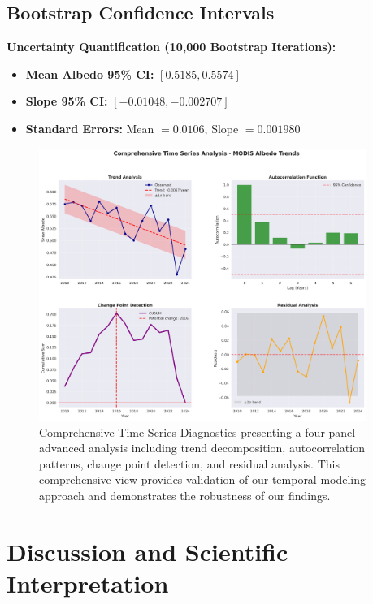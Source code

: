 \documentclass[12pt,a4paper]{article}
\begin{document}
\subsection{Bootstrap Confidence Intervals}

\textbf{Uncertainty Quantification (10,000 Bootstrap Iterations):}
\begin{itemize}
    \item \textbf{Mean Albedo 95\% CI:} $[0.5185, 0.5574]$
    \item \textbf{Slope 95\% CI:} $[-0.01048, -0.002707]$
    \item \textbf{Standard Errors:} Mean $= 0.0106$, Slope $= 0.001980$
\end{itemize}

\begin{figure}[H]
\centering
\includegraphics[width=0.95\textwidth]{advanced_plots/comprehensive_time_series.png}
\caption{Comprehensive Time Series Diagnostics presenting a four-panel advanced analysis including trend decomposition, autocorrelation patterns, change point detection, and residual analysis. This comprehensive view provides validation of our temporal modeling approach and demonstrates the robustness of our findings.}
\label{fig:comprehensive_diagnostics}
\end{figure}

\section{Discussion and Scientific Interpretation}
\end{document}
